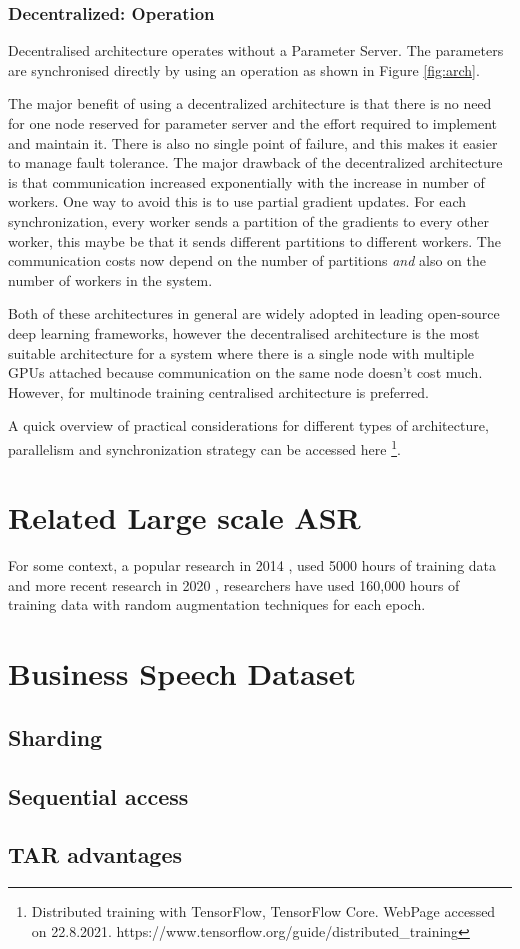 \subsubsection{Decentralized:  Operation}
Decentralised architecture operates without a Parameter Server. The parameters are synchronised directly by using an  operation as shown in Figure \ref{fig:arch}. 

The major benefit of using a decentralized architecture is that there is no need for one node reserved for parameter server and the effort required to implement and maintain it. There is also no single point of failure, and this makes it easier to manage fault tolerance. The major drawback of the decentralized architecture is that communication increased exponentially with the increase in number of workers. One way to avoid this is to use partial gradient updates. For each synchronization, every worker sends a partition of the gradients to every other worker, this maybe be that it sends different partitions to different workers.  The communication costs now depend on the number of partitions \emph{and} also on the number of workers in the system. 

Both of these architectures in general are widely adopted in leading open-source deep learning frameworks, however the decentralised architecture is the most suitable architecture for a system where there is a single node with multiple GPUs attached because communication on the same node doesn't cost much. However, for multinode training centralised architecture is preferred. 

A quick overview of practical considerations for different types of architecture, parallelism and synchronization strategy can be accessed here \footnote{Distributed training with TensorFlow, TensorFlow Core. WebPage accessed on 22.8.2021. https://www.tensorflow.org/guide/distributed\_training}. 


\section{Related Large scale ASR}
For some context, a popular research in 2014 \cite{Hannun2014DeepRecognition}, used 5000 hours of training data and more recent research in 2020 \cite{Li2020OnRecognition}, researchers have used 160,000 hours of training data with random augmentation techniques for each epoch. 
 
 
\section{Business Speech Dataset}

\subsection{Sharding}
\subsection{Sequential access}
\subsection{TAR advantages}

